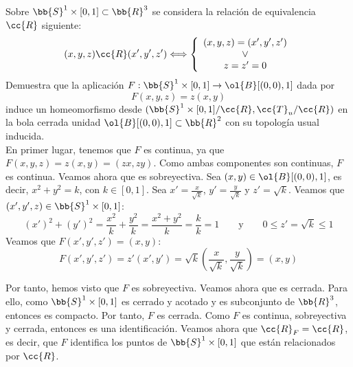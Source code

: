 \documentclass[12pt]{article}
\newcommand{\T}[0]{\cc{T}}
\begin{document}
    \begin{ejercicio}[5 puntos]
        Sobre $\bb{S}^1\times [0,1]\subset \bb{R}^3$ se considera la relación de equivalencia $\cc{R}$ siguiente:
        \begin{equation*}
            (x,y,z)\cc{R}(x',y',z')\Longleftrightarrow \left\{\begin{array}{c}
                (x,y,z)=(x',y',z') \\\lor\\
                z=z'=0
            \end{array}\right.
        \end{equation*}
        Demuestra que la aplicación $F:\bb{S}^1\times [0,1]\to \ol{B}[(0,0), 1]$ dada por
        \begin{equation*}
            F(x,y,z)=z(x,y)
        \end{equation*}
        induce un homeomorfismo desde $(\bb{S}^1\times [0,1]/\cc{R},\T_u/\cc{R})$ en la bola cerrada unidad $\ol{B}[(0,0), 1]\subset \bb{R}^2$ con su topología usual inducida.\\

        En primer lugar, tenemos que $F$ es continua, ya que $F(x,y,z) = z(x,y)=(zx,zy)$. Como ambas componentes son continuas, $F$ es continua. Veamos ahora que es sobreyectiva. Sea $(x,y)\in \ol{B}[(0,0), 1]$,
        es decir, $x^2+y^2=k$, con $k\in [0,1]$. Sea $x'=\frac{x}{\sqrt{k}}$, $y'=\frac{y}{\sqrt{k}}$ y $z'=\sqrt{k}$. Veamos que $(x',y',z)\in \bb{S}^1\times [0,1]$:
        \begin{equation*}
            (x')^2 + (y')^2 = \frac{x^2}{k} + \frac{y^2}{k} = \frac{x^2+y^2}{k} = \frac{k}{k} = 1 \qquad \text{y} \qquad 0\leq z' = \sqrt{k} \leq 1
        \end{equation*}
        Veamos que $F(x',y',z') = (x,y)$:
        \begin{equation*}
            F(x',y',z') = z'(x',y') = \sqrt{k}\left(\frac{x}{\sqrt{k}},\frac{y}{\sqrt{k}}\right) = (x,y)
        \end{equation*}

        Por tanto, hemos visto que $F$ es sobreyectiva. Veamos ahora que es cerrada. Para ello,
        como $\bb{S}^1\times [0,1]$ es cerrado y acotado y es subconjunto de $\bb{R}^3$, entonces es compacto.
        Por tanto, $F$ es cerrada. Como $F$ es continua, sobreyectiva y cerrada, entonces es una identificación. Veamos ahora que
        $\cc{R}_F = \cc{R}$, es decir, que $F$ identifica los puntos de $\bb{S}^1\times [0,1]$ que están relacionados por $\cc{R}$.


\end{ejercicio}
\end{document}

